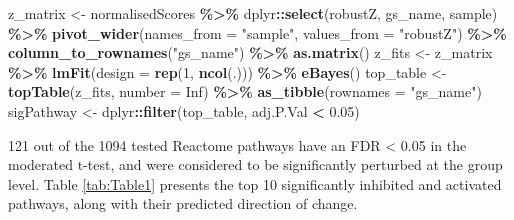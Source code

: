 \documentclass[9pt,a4paper,]{extarticle}
\newenvironment{Shaded}{\begin{snugshade}}{\end{snugshade}}
\newcommand{\AttributeTok}[1]{\textcolor[rgb]{0.13,0.29,0.53}{#1}}
\newcommand{\ConstantTok}[1]{\textcolor[rgb]{0.56,0.35,0.01}{#1}}
\newcommand{\DecValTok}[1]{\textcolor[rgb]{0.00,0.00,0.81}{#1}}
\newcommand{\FloatTok}[1]{\textcolor[rgb]{0.00,0.00,0.81}{#1}}
\newcommand{\FunctionTok}[1]{\textcolor[rgb]{0.13,0.29,0.53}{\textbf{#1}}}
\newcommand{\NormalTok}[1]{#1}
\newcommand{\OtherTok}[1]{\textcolor[rgb]{0.56,0.35,0.01}{#1}}
\newcommand{\SpecialCharTok}[1]{\textcolor[rgb]{0.81,0.36,0.00}{\textbf{#1}}}
\newcommand{\StringTok}[1]{\textcolor[rgb]{0.31,0.60,0.02}{#1}}
\begin{document}
\begin{Shaded}
\begin{Highlighting}[]
\NormalTok{z\_matrix }\OtherTok{\textless{}{-}}\NormalTok{ normalisedScores }\SpecialCharTok{\%\textgreater{}\%}
\NormalTok{  dplyr}\SpecialCharTok{::}\FunctionTok{select}\NormalTok{(robustZ, gs\_name, sample) }\SpecialCharTok{\%\textgreater{}\%}
  \FunctionTok{pivot\_wider}\NormalTok{(}\AttributeTok{names\_from =} \StringTok{"sample"}\NormalTok{, }\AttributeTok{values\_from =} \StringTok{"robustZ"}\NormalTok{) }\SpecialCharTok{\%\textgreater{}\%}
  \FunctionTok{column\_to\_rownames}\NormalTok{(}\StringTok{"gs\_name"}\NormalTok{) }\SpecialCharTok{\%\textgreater{}\%}
  \FunctionTok{as.matrix}\NormalTok{()}
\NormalTok{z\_fits }\OtherTok{\textless{}{-}}\NormalTok{ z\_matrix }\SpecialCharTok{\%\textgreater{}\%} 
  \FunctionTok{lmFit}\NormalTok{(}\AttributeTok{design =} \FunctionTok{rep}\NormalTok{(}\DecValTok{1}\NormalTok{, }\FunctionTok{ncol}\NormalTok{(.))) }\SpecialCharTok{\%\textgreater{}\%} 
  \FunctionTok{eBayes}\NormalTok{()}
\NormalTok{top\_table }\OtherTok{\textless{}{-}} \FunctionTok{topTable}\NormalTok{(z\_fits, }\AttributeTok{number =} \ConstantTok{Inf}\NormalTok{) }\SpecialCharTok{\%\textgreater{}\%}
  \FunctionTok{as\_tibble}\NormalTok{(}\AttributeTok{rownames =} \StringTok{"gs\_name"}\NormalTok{)}
\NormalTok{sigPathway }\OtherTok{\textless{}{-}}\NormalTok{ dplyr}\SpecialCharTok{::}\FunctionTok{filter}\NormalTok{(top\_table, adj.P.Val }\SpecialCharTok{\textless{}} \FloatTok{0.05}\NormalTok{)}
\end{Highlighting}
\end{Shaded}

121 out of the 1094 tested Reactome pathways have an FDR \textless{} 0.05 in the moderated t-test, and were considered to be significantly perturbed at the group level.
Table \ref{tab:Table1} presents the top 10 significantly inhibited and activated pathways, along with their predicted direction of change.
\end{document}
